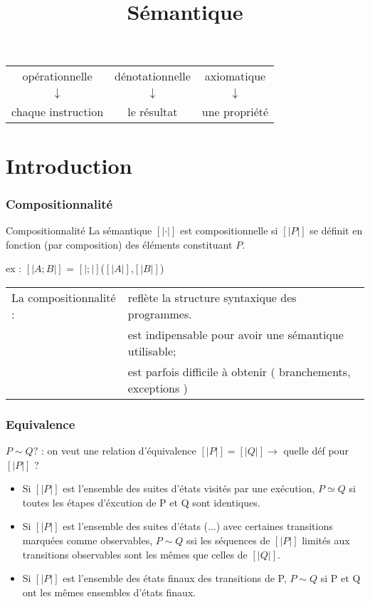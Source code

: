 \documentclass[10pt,a4paper]{article}
\title{Sémantique}
\date{}
\newcommand{\sem}[1]{$\left[| #1 | \right]$}
\newcommand{\semm}[1]{\left[| #1 | \right]}
\begin{document}
\makeatletter
{}
\makeatother

\maketitle


\begin{center}
\begin{tabular}{c c c}
opérationnelle & dénotationnelle & axiomatique \\
$\downarrow$ &  $\downarrow$ &  $\downarrow$ \\
chaque instruction & le résultat & une propriété \\
\end{tabular}
\end{center}



\part{Introduction}
\section{Compositionnalité}

\begin{definition}{Compositionnalité}
 La sémantique \sem{\cdot} est compositionnelle si \sem{P} se définit en fonction (par composition) des éléments constituant $P$.\\
\end{definition}

ex : \sem{A;B} = \sem{;}(\sem{A},\sem{B})\\

\begin{tabular}{l l}
La compositionnalité : & reflète la structure syntaxique des programmes.\\
& est indipensable pour avoir une sémantique utilisable;\\
& est parfois difficile à obtenir ( branchements, exceptions )
\end{tabular}


\section{Equivalence}
$P \sim Q ?$ : on veut une relation d'équivalence
$\semm{P} = \semm{Q} \rightarrow$ quelle déf pour \sem{P} ?\\
\begin{itemize}
\item Si \sem{P} est l'ensemble des suites d'états visités par une exécution, $P \simeq Q$ si toutes les étapes d'éxcution de P et Q sont identiques.
\item Si \sem{P} est l'ensemble des suites d'états (...) avec certaines transitions marquées comme observables, $P \sim Q$ ssi les séquences de \sem{P} limités aux transitions observables sont les mêmes que celles de \sem{Q}.
\item Si \sem{P} est l'ensemble des états finaux des transitions de P, $P \sim Q$ si P et Q ont les mêmes ensembles d'états finaux.
\end{itemize}
\end{document}
